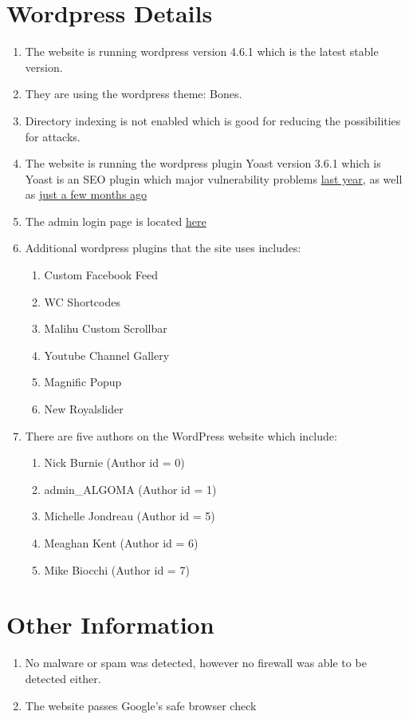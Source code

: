 \documentclass[a4paper, 11pt]{article}
\begin{document}
\section*{Wordpress Details}
\begin{enumerate}
\item The website is running wordpress version 4.6.1 which is the latest stable version.
\item They are using the wordpress theme: Bones.
\item Directory indexing is not enabled which is good for reducing the possibilities for attacks.
\item The website is running the wordpress plugin Yoast version 3.6.1 which is Yoast is an SEO plugin which major vulnerability problems \href{http://thehackernews.com/2015/03/wordpress-seo-by-yoast-plugin.html}{last year}, as well as \href{https://www.wordfence.com/blog/2016/05/yoast-seo-vulnerability/}{just a few months ago}
\item The admin login page is located \href{www.algomau.ca/wp-admin}{here}
\item Additional wordpress plugins that the site uses includes:
	\begin{enumerate}
	\item Custom Facebook Feed
	\item WC Shortcodes
	\item Malihu Custom Scrollbar
	\item Youtube Channel Gallery
	\item Magnific Popup
	\item New Royalslider
	\end{enumerate}
\item There are five authors on the WordPress website which include:
	\begin{enumerate}
	\item Nick Burnie (Author id = 0)
	\item admin\_ALGOMA (Author id = 1)
	\item Michelle Jondreau (Author id = 5)
	\item Meaghan Kent (Author id = 6)
	\item Mike Biocchi (Author id = 7)
	\end{enumerate}
\end{enumerate}


\section*{Other Information}
\begin{enumerate}
\item No malware or spam was detected, however no firewall was able to be detected either.
\item The website passes Google's safe browser check 
\end{enumerate}



  
\end{document}
